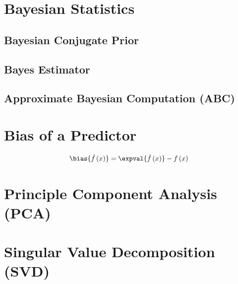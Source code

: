 \section{Bayesian Statistics}
\label{stats:Bayes}


\subsection{Bayesian Conjugate Prior}
\label{stats:Bayes:conjugate_prior}

\subsection{Bayes Estimator}
\label{stats:Bayes:estimator}

\subsection{Approximate Bayesian Computation (ABC)}
\label{stats:Bayes:ABC}

\section{Bias of a Predictor}
\label{stats:bias}

\begin{equation}\label{eq:stats:bias}
\bias{\hat{f}\left(x\right)} = \expval{\hat{f}\left(x\right)} - f\left(x\right)
\end{equation}

\section{Principle Component Analysis (PCA)}
\label{stats:PCA}

\section{Singular Value Decomposition (SVD)}
\label{stats:SVD}

